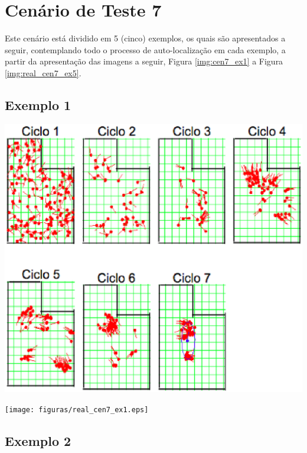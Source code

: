 \section{Cenário de Teste 7}
\label{sec:cenario6}

Este cenário está dividido em 5 (cinco) exemplos, os quais são apresentados a seguir, contemplando todo o processo de auto-localização
em cada exemplo, a partir da apresentação das imagens a seguir, Figura \ref{img:cen7_ex1} a Figura \ref{img:real_cen7_ex5}.

\subsection{Exemplo 1}

{\centering
\includegraphics[scale=0.4]{figuras/cen7_ex1.eps}
\label{img:cen7_ex1}
\par}

{\centering
\texttt{[image: figuras/real\_cen7\_ex1.eps]}
\label{img:real_cen7_ex1}
\par}

\subsection{Exemplo 2}

